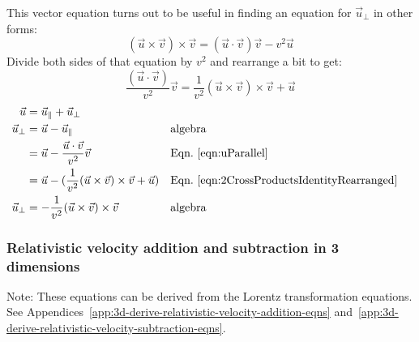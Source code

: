 \documentclass[a4paper]{article}
\theoremstyle{plain}
\theoremstyle{definition}
\newcommand{\vect}[1]{\vec{#1}}
\begin{document}
This vector equation turns out to be useful in finding an equation for
$\vect{u}_{\perp}$ in other forms:
\begin{equation}
(\vect{u} \times \vect{v}) \times \vect{v} = (\vect{u} \cdot \vect{v}) \vect{v} - v^2 \vect{u} \label{eqn:2CrossProductsIdentity}
\end{equation}
Divide both sides of that equation by $v^2$ and rearrange a bit to get:
\begin{equation}
\frac{(\vect{u} \cdot \vect{v})}{v^2} \vect{v} = \frac{1}{v^2} (\vect{u} \times \vect{v}) \times \vect{v} + \vect{u} \label{eqn:2CrossProductsIdentityRearranged}
\end{equation}
\begin{align}
\vect{u} & = \vect{u}_{\parallel} + \vect{u}_{\perp} \nonumber \\
\vect{u}_{\perp}
  & = \vect{u} - \vect{u}_{\parallel} & & \text{algebra} \nonumber \\
  & = \vect{u} - \frac{\vect{u} \cdot \vect{v}}{v^2} \vect{v} & & \text{Eqn.~\eqref{eqn:uParallel}} \nonumber \\
  & = \vect{u} - (\frac{1}{v^2} (\vect{u} \times \vect{v}) \times \vect{v} + \vect{u}) & & \text{Eqn.~\eqref{eqn:2CrossProductsIdentityRearranged}} \nonumber \\\vect{u}_{\perp}
  & = - \frac{1}{v^2} (\vect{u} \times \vect{v}) \times \vect{v} & & \text{algebra} \label{eqn:uPerpendicular}
\end{align}


\subsubsection{Relativistic velocity addition and subtraction in 3 dimensions}
\label{app:3drelvelocityadd}

Note: These equations can be derived from the Lorentz transformation
equations.  See
Appendices~\ref{app:3d-derive-relativistic-velocity-addition-eqns}
and~\ref{app:3d-derive-relativistic-velocity-subtraction-eqns}.
\end{document}
